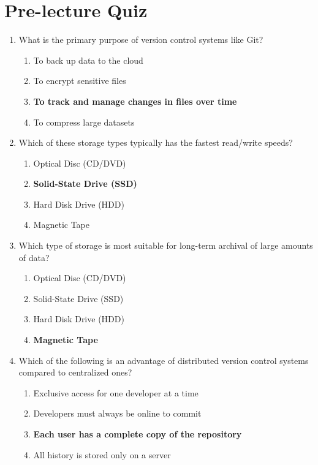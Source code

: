 \newpage

\section{Pre-lecture Quiz}

\begin{enumerate}
    \item What is the primary purpose of version control systems like Git?
    \begin{enumerate}
        \item To back up data to the cloud
        \item To encrypt sensitive files
        \item \textbf{To track and manage changes in files over time}
        \item To compress large datasets
    \end{enumerate}

    \item Which of these storage types typically has the fastest read/write
          speeds?
    \begin{enumerate}
        \item Optical Disc (CD/DVD)
        \item \textbf{Solid-State Drive (SSD)}
        \item Hard Disk Drive (HDD)
        \item Magnetic Tape
    \end{enumerate}

    \item Which type of storage is most suitable for long-term archival of large
          amounts of data?
    \begin{enumerate}
        \item Optical Disc (CD/DVD)
        \item Solid-State Drive (SSD)
        \item Hard Disk Drive (HDD)
        \item \textbf{Magnetic Tape}
    \end{enumerate}

    \item Which of the following is an advantage of distributed version control
          systems compared to centralized ones?
    \begin{enumerate}
        \item Exclusive access for one developer at a time
        \item Developers must always be online to commit
        \item \textbf{Each user has a complete copy of the repository}
        \item All history is stored only on a server
    \end{enumerate}


\end{enumerate}
